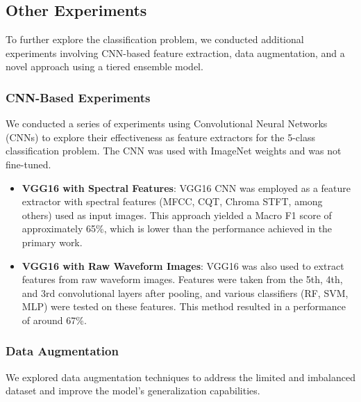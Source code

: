 \subsection{Other Experiments}
To further explore the classification problem, we conducted additional experiments 
involving CNN-based feature extraction, data augmentation, and a novel approach 
using a tiered ensemble model.

\subsubsection*{CNN-Based Experiments}

We conducted a series of experiments using Convolutional Neural Networks (CNNs) to explore their 
effectiveness as feature extractors for the 5-class classification problem. The CNN was
used with ImageNet weights and was not fine-tuned.

\begin{itemize}[leftmargin=*]
    \item \textbf{VGG16 with Spectral Features}: VGG16 CNN was employed as a feature extractor with 
    spectral features (MFCC, CQT, Chroma STFT, among others) used as input images. This approach yielded 
    a Macro F1 score of approximately 65\%, which is lower than the performance achieved in the primary 
    work.
    \item \textbf{VGG16 with Raw Waveform Images}: VGG16 was also used to extract features from raw 
    waveform images. Features were taken from the 5th, 4th, and 3rd convolutional layers after pooling, 
    and various classifiers (RF, SVM, MLP) were tested on these features. This method resulted in a 
    performance of around 67\%.
\end{itemize}

\subsubsection*{Data Augmentation}

We explored data augmentation techniques to address the limited and imbalanced dataset and improve
the model's generalization capabilities.


